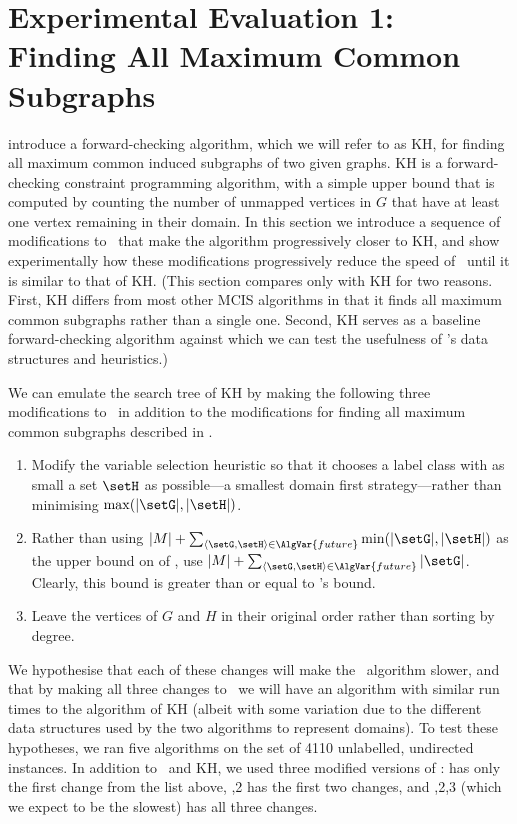 \section{Experimental Evaluation 1: Finding All Maximum Common Subgraphs}
\label{sec:mcsplit-finding-all}

\citet{DBLP:journals/spe/KrissinelH04} introduce a forward-checking
algorithm, which we will refer to as KH, for finding all maximum common
induced subgraphs of two given graphs.  KH is a
forward-checking constraint programming algorithm, with a simple upper bound
that is computed by counting the number of unmapped vertices in $G$ that have
at least one vertex remaining in their domain.  In this section we
introduce a sequence of modifications to \McSplit\ that make the algorithm
progressively closer to KH, and show experimentally how these modifications
progressively reduce the speed of \McSplit\ until it is similar to that of KH.
(This section compares only with KH for two reasons. First,
KH differs from most other MCIS algorithms in that it finds all maximum common 
subgraphs rather than a single one.  Second, KH serves as a baseline
forward-checking algorithm against which we can test the usefulness of
\McSplit's data structures and heuristics.)

We can emulate the search tree of KH
by making the following three modifications to \McSplit\ in addition to the modifications for
finding all maximum common subgraphs described in .

\begin{enumerate}
    \item Modify the variable selection heuristic so that it chooses a label class with
as small a set $\setH$ as possible---a smallest domain first strategy---rather than minimising $\max(|\setG|,|\setH|)$.
    \item Rather 
than using $|M|  + \sum_{\langle \setG,\setH \rangle \in \AlgVar{future}} \min(|\setG|,|\setH|)$
as the upper bound on  of ,
use $|M|  + \sum_{\langle \setG,\setH \rangle \in \AlgVar{future}} |\setG|$.  Clearly,
this bound is greater than or equal to \McSplit's bound.
    \item Leave the vertices of $G$ and $H$ in their original order rather than sorting
        by degree.
\end{enumerate}

We hypothesise that each of these changes will make the \McSplit\ algorithm slower, and that
by making all three changes to \McSplit\ we will have an algorithm with similar run times
to the algorithm of KH (albeit with some variation due to the different data structures
used by the two algorithms to represent domains).
To test these hypotheses, we ran five algorithms
on the set of 4110 unlabelled, undirected instances.  In addition to \McSplit\ and
KH, we used three modified versions of \McSplit:
 has only the first change from the list above,
,2 has the first two changes, and
,2,3 (which we expect to be the slowest) has all three changes.

